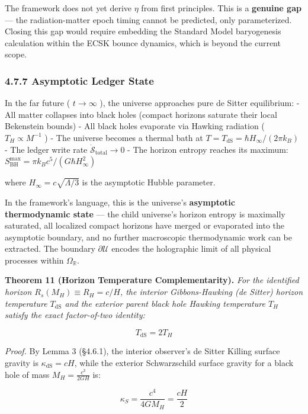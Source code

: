 \documentclass[11pt,a4paper]{article}
\theoremstyle{definition}\newtheorem{definition}{Definition}
\theoremstyle{remark}\newtheorem{remark}{Remark}
\begin{document}
The framework does not yet derive $\eta$ from first principles. This is a \textbf{genuine gap} — the radiation-matter epoch timing cannot be predicted, only parameterized. Closing this gap would require embedding the Standard Model baryogenesis calculation within the ECSK bounce dynamics, which is beyond the current scope.
\subsubsection{4.7.7 Asymptotic Ledger State}

In the far future ( $t \to \infty$ ), the universe approaches pure de Sitter equilibrium:
- All matter collapses into black holes (compact horizons saturate their local Bekenstein bounds)
- All black holes evaporate via Hawking radiation ( $T_H \propto M^{-1}$ )
- The universe becomes a thermal bath at $T = T_{\text{dS}} = \hbar H_\infty / (2\pi k_B)$
- The ledger write rate $\dot{\mathcal{S}}_{\text{total}} \to 0$
- The horizon entropy reaches its maximum: $S_{\text{BH}}^{\text{max}} = \pi k_B c^5 / (G\hbar H_\infty^2)$

where $H_\infty = c\sqrt{\Lambda/3}$ is the asymptotic Hubble parameter.

In the framework's language, this is the universe's \textbf{asymptotic thermodynamic state} — the child universe's horizon entropy is maximally saturated, all localized compact horizons have merged or evaporated into the asymptotic boundary, and no further macroscopic thermodynamic work can be extracted. The boundary $\partial\mathcal{U}$ encodes the holographic limit of all physical processes within $\Omega_{\mathbb{R}}$.

\textbf{Theorem 11 (Horizon Temperature Complementarity).} \textit{For the identified horizon $R_s(M_H) \equiv R_H = c/H$, the interior Gibbons-Hawking (de Sitter) horizon temperature $T_{\text{dS}}$ and the exterior parent black hole Hawking temperature $T_H$ satisfy the exact factor-of-two identity:}


\begin{equation}
T_{\text{dS}} = 2 T_H
\end{equation}


\textit{Proof.} By Lemma 3 (§4.6.1), the interior observer's de Sitter Killing surface gravity is $\kappa_{\text{dS}} = c H$, while the exterior Schwarzschild surface gravity for a black hole of mass $M_H = \frac{c^3}{2GH}$ is:


\begin{equation}
\kappa_S = \frac{c^4}{4 G M_H} = \frac{c H}{2}
\end{equation}
\end{document}
